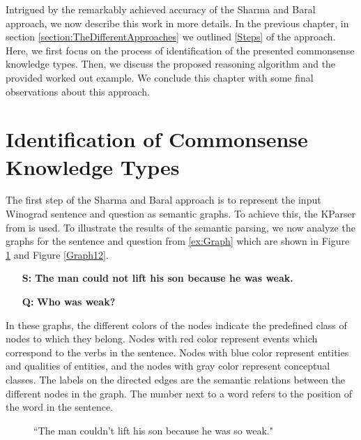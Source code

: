 \label{knowledge_types}
Intrigued by the remarkably achieved accuracy of the Sharma and Baral \cite{2018CommonsenseKT} approach, we now describe this work in more details. In the previous chapter, in section \ref{section:TheDifferentApproaches} we outlined \ref{Steps} of the approach. Here, we first focus on the process of identification of the presented commonsense knowledge types. Then, we discuss the proposed reasoning algorithm and the provided worked out example. We conclude this chapter with some final observations about this approach.


\section{Identification of Commonsense Knowledge Types}
The first step of the Sharma and Baral \cite{2018CommonsenseKT} approach is to represent the input Winograd sentence and question as semantic graphs. To achieve this, the KParser from \cite{DBLP:conf/ijcai/SharmaVAB15} is used. 
To illustrate the results of the semantic parsing, we now analyze the graphs for the sentence and question from \ref{ex:Graph} which are shown in Figure \ref{Graph11} and Figure \ref{Graph12}. \\ 
\begin{itemize}
	\item[\textbf{S:}] \textbf{The man could not lift his son because he was weak.}
	\item[\textbf{Q:}] \textbf{Who was weak?}
\end{itemize}

In these graphs, the different colors of the nodes indicate the predefined class of nodes to which they belong. 
Nodes with red color represent events which correspond to the verbs in the sentence. Nodes with blue color represent entities and qualities of entities, and the nodes with gray color represent conceptual classes. The labels on the directed edges are the semantic relations between the different nodes in the graph. The number next to a word refers to the position of the word in the sentence. 
\begin{figure}
	\centering
	
	\caption{\label{Graph11}``The man couldn't lift his son because he was so weak."}
\end{figure}


